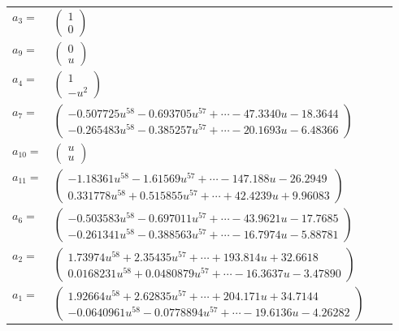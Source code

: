 \documentclass[1p]{elsarticle_modified}
\theoremstyle{definition}
\begin{document}
\begin{tabular}{m{7pt} m{180pt} m{7pt} m{180pt} }
\flushright $a_{3}=$&$\begin{pmatrix}1\\0\end{pmatrix}$ \\
\flushright $a_{9}=$&$\begin{pmatrix}0\\u\end{pmatrix}$ \\
\flushright $a_{4}=$&$\begin{pmatrix}1\\- u^2\end{pmatrix}$ \\
\flushright $a_{7}=$&$\begin{pmatrix}-0.507725 u^{58}-0.693705 u^{57}+\cdots-47.3340 u-18.3644\\-0.265483 u^{58}-0.385257 u^{57}+\cdots-20.1693 u-6.48366\end{pmatrix}$ \\
\flushright $a_{10}=$&$\begin{pmatrix}u\\u\end{pmatrix}$ \\
\flushright $a_{11}=$&$\begin{pmatrix}-1.18361 u^{58}-1.61569 u^{57}+\cdots-147.188 u-26.2949\\0.331778 u^{58}+0.515855 u^{57}+\cdots+42.4239 u+9.96083\end{pmatrix}$ \\
\flushright $a_{6}=$&$\begin{pmatrix}-0.503583 u^{58}-0.697011 u^{57}+\cdots-43.9621 u-17.7685\\-0.261341 u^{58}-0.388563 u^{57}+\cdots-16.7974 u-5.88781\end{pmatrix}$ \\
\flushright $a_{2}=$&$\begin{pmatrix}1.73974 u^{58}+2.35435 u^{57}+\cdots+193.814 u+32.6618\\0.0168231 u^{58}+0.0480879 u^{57}+\cdots-16.3637 u-3.47890\end{pmatrix}$ \\
\flushright $a_{1}=$&$\begin{pmatrix}1.92664 u^{58}+2.62835 u^{57}+\cdots+204.171 u+34.7144\\-0.0640961 u^{58}-0.0778894 u^{57}+\cdots-19.6136 u-4.26282\end{pmatrix}$ \\

\end{tabular}
\end{document}
